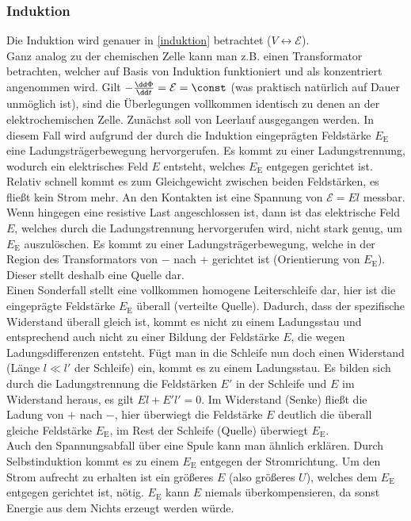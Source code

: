   \subsubsection{Induktion}
  Die Induktion wird genauer in \ref{induktion} betrachtet ($V\leftrightarrow\mathcal{E}$). \\
  Ganz analog zu der chemischen Zelle kann man z.B. einen Transformator betrachten, welcher auf Basis von Induktion funktioniert und als konzentriert angenommen wird. Gilt $-\frac{\dd \Phi}{\dd t}=\mathcal{E}=\const$ (was praktisch natürlich auf Dauer unmöglich ist), sind die Überlegungen vollkommen identisch zu denen an der elektrochemischen Zelle. Zunächst soll von Leerlauf ausgegangen werden. In diesem Fall wird aufgrund der durch die Induktion eingeprägten Feldstärke $E_\mathrm{E}$ eine Ladungsträgerbewegung hervorgerufen. Es kommt zu einer Ladungstrennung, wodurch ein elektrisches Feld $E$ entsteht, welches $E_\mathrm{E}$ entgegen gerichtet ist. Relativ schnell kommt es zum Gleichgewicht zwischen beiden Feldstärken, es fließt kein Strom mehr. An den Kontakten ist eine Spannung von $\mathcal{E}=El$ messbar.\\
  Wenn hingegen eine resistive Last angeschlossen ist, dann ist das elektrische Feld $E$, welches durch die Ladungstrennung hervorgerufen wird, nicht stark genug, um $E_\mathrm{E}$ auszulöschen. Es kommt zu einer Ladungsträgerbewegung, welche in der Region des Transformators von $-$ nach $+$ gerichtet ist (Orientierung von $E_\mathrm{E}$). Dieser stellt deshalb eine Quelle dar.\\
  Einen Sonderfall stellt eine vollkommen homogene Leiterschleife dar, hier ist die eingeprägte Feldstärke $E_\mathrm{E}$ überall (verteilte Quelle). Dadurch, dass der spezifische Widerstand überall gleich ist, kommt es nicht zu einem Ladungsstau und entsprechend auch nicht zu einer Bildung der Feldstärke $E$, die wegen Ladungsdifferenzen entsteht. Fügt man in die Schleife nun doch einen Widerstand (Länge $l\ll l'$ der Schleife) ein, kommt es zu einem Ladungsstau. Es bilden sich durch die Ladungstrennung die Feldstärken $E'$ in der Schleife und $E$ im Widerstand heraus, es gilt $El+E'l'=0$. Im Widerstand (Senke) fließt die Ladung von $+$ nach $-$, hier überwiegt die Feldstärke $E$ deutlich die überall gleiche Feldstärke $E_\mathrm{E}$, im Rest der Schleife (Quelle) überwiegt $E_\mathrm{E}$. \\
  Auch den Spannungsabfall über eine Spule kann man ähnlich erklären. Durch Selbstinduktion kommt es zu einem $E_\mathrm{E}$ entgegen der Stromrichtung. Um den Strom aufrecht zu erhalten ist ein größeres $E$ (also größeres $U$), welches dem $E_\mathrm{E}$ entgegen gerichtet ist, nötig. $E_\mathrm{E}$ kann $E$ niemals überkompensieren, da sonst Energie aus dem Nichts erzeugt werden würde.
